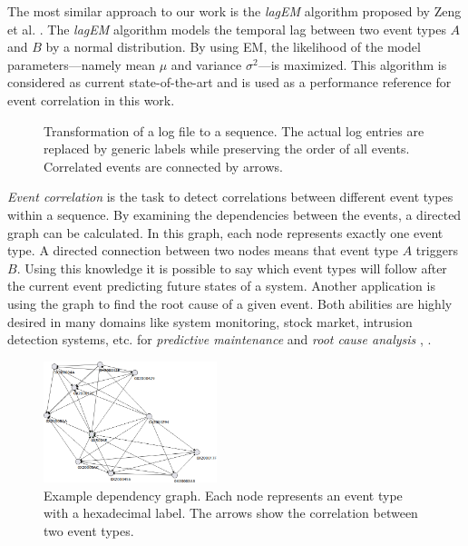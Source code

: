 \documentclass[conference]{IEEEtran}
\theoremstyle{examplestyle}
\begin{document}
The most similar approach to our work is the \textit{lagEM} algorithm proposed by Zeng et al. \cite{Zeng2015}. The \textit{lagEM} algorithm models the temporal lag between two event types \(A\) and \(B\) by a normal distribution. By using \ac{EM}, the likelihood of the model parameters---namely mean \(\mu\) and variance \(\sigma^2\)---is maximized. This algorithm is considered as current state-of-the-art and is used as a performance reference for event correlation in this work.

\begin{figure}[!tb]
	\centering
	\caption{Transformation of a log file to a sequence. The actual log entries are replaced by generic labels while preserving the order of all events. Correlated events are connected by arrows.}
	\label{fig:logToSequence}
\end{figure}


\textit{Event correlation} is the task to detect correlations between different event types within a sequence. By examining the dependencies between the events, a directed graph can be calculated. In this graph, each node represents exactly one event type. A directed connection between two nodes means that event type \(A\) triggers \(B\). Using this knowledge it is possible to say which event types will follow after the current event predicting future states of a system. Another application is using the graph to find the root cause of a given event. Both abilities are highly desired in many domains like system monitoring, stock market, intrusion detection systems, etc. for \textit{predictive maintenance} and \textit{root cause analysis} \cite{Zeng2015}, \cite{Benferhat2008}.


\begin{figure}[!htb]
	\centering
	\includegraphics[width=0.45\textwidth]{images/dependency-graph}
	\caption{Example dependency graph. Each node represents an event type with a hexadecimal label. The arrows show the correlation between two event types.}
	\label{fig:exampleDependencyGraph}
\end{figure}
\end{document}
